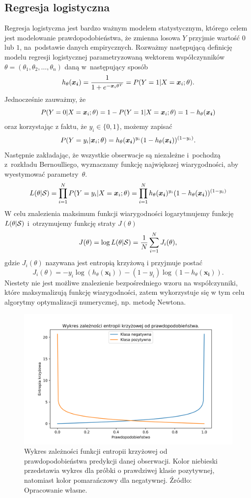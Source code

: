\documentclass[inzynierska]{pwr_wmat_praca_dyplomowa}
\theoremstyle{plain}
\numberwithin{theorem}{chapter}
\theoremstyle{definition}
\numberwithin{theorem}{chapter}
\begin{document}
\subsection{Regresja logistyczna}
\label{reg-log}
Regresja logistyczna jest bardzo ważnym modelem statystycznym, którego celem jest modelowanie prawdopodobieństwa, że zmienna losowa $Y$ przyjmie wartość $0$ lub $1$, na~podstawie danych empirycznych. Rozważmy następującą definicję modelu regresji logistycznej parametryzowaną wektorem współczynników $\theta = (\theta_1, \theta_2, \dots, \theta_n)$ daną w~następujący sposób
\begin{equation}
	h_{\theta}(\boldsymbol{x_i}) = \frac{1}{1+e^{-\boldsymbol{x}_{i}\theta^T}} = P(Y = 1|X = \boldsymbol{x}_{i};\theta) \text{.}
\end{equation} 
Jednocześnie zauważmy, że
$$ P(Y = 0|X = \boldsymbol{x}_{i};\theta) = 1 - P(Y = 1|X = \boldsymbol{x}_{i};\theta) = 1 - h_{\theta}(\boldsymbol{x_i}) $$
oraz korzystając z faktu, że $y_i \in \{0,1\}$, możemy zapisać 
$$ P(Y = y_i|\boldsymbol{x}_{i};\theta) = h_{\theta}(\boldsymbol{x_i})^{y_i}(1-h_{\theta}(\boldsymbol{x_i}))^{(1-y_i)} \text{.}$$
Następnie zakładając, że wszystkie obserwacje są niezależne i~pochodzą z~rozkładu Bernoulliego, wyznaczamy funkcję największej wiarygodności, aby wyestymować parametry~$\theta$.
$$ L(\theta | \mathcal{S}) = \prod_{i=1}^N P(Y = y_i | X = \boldsymbol{x}_{i}; \theta) = \prod_{i=1}^N h_{\theta}(\boldsymbol{x_i})^{y_i}(1-h_{\theta}(\boldsymbol{x_i}))^{(1-y_i)}$$
W celu znalezienia maksimum funkcji wiarygodności logarytmujemy funkcję $L(\theta | \mathcal{S})$ i~otrzymujemy funkcję straty $J(\theta)$
$$ J(\theta) = \log L(\theta | \mathcal{S})  = \frac{1}{N} \sum_{i=1}^N J_i(\theta)\text{,}$$
gdzie $J_i(\theta)$ nazywana jest entropią krzyżową i przyjmuje postać
\begin{equation}
	\label{c-e}
	J_i(\theta) = -y_i\log(h_{\theta}(\boldsymbol{x_i})) - (1-y_i)\log(1 - h_{\theta}(\boldsymbol{x_i})) \text{.}
\end{equation}
Niestety nie jest możliwe znalezienie bezpośredniego wzoru na współczynniki, które maksymalizują funkcję wiarygodności, zatem wykorzystuje się w tym celu algorytmy optymalizacji numerycznej, np. metodę Newtona.

\begin{figure}[h]
	\includegraphics[width=\linewidth]{images/cross_entropy.png}
	\caption{Wykres zależności funkcji entropii krzyżowej od prawdopodobieństwa predykcji danej obserwacji. Kolor niebieski przedstawia wykres dla próbki o prawdziwej klasie pozytywnej, natomiast kolor pomarańczowy dla negatywnej. Źródło: Opracowanie własne.}
	\label{fig:cross-entropy-plot}
\end{figure}
\end{document}
